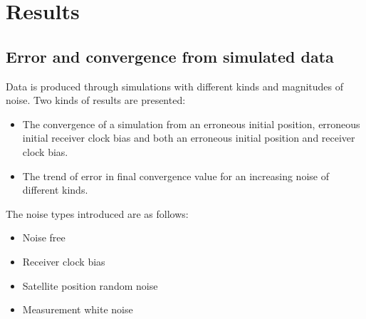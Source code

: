 
\chapter{Results}
\section{Error and convergence from simulated data} \label{simDataError}
Data is produced through simulations with different kinds and magnitudes of noise. Two kinds of results are presented:
\begin{itemize}
\item The convergence of a simulation from an erroneous initial position, erroneous initial receiver clock bias and both an erroneous initial position and receiver clock bias.
\item The trend of error in final convergence value for an increasing noise of different kinds.
\end{itemize} 
The noise types introduced are as follows:
\begin{itemize}
\item Noise free
\item Receiver clock bias
\item Satellite position random noise
\item Measurement white noise
\end{itemize}

